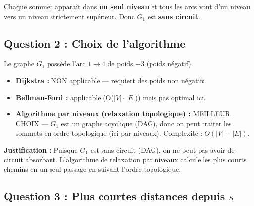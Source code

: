 \documentclass[12pt,a4paper]{article}
\begin{document}
\begin{solution}
\begin{center}
\end{center}

Chaque sommet apparaît dans \textbf{un seul niveau} et tous les arcs vont d'un niveau vers un niveau strictement supérieur. Donc $G_1$ est \textcolor{importantrouge}{\textbf{sans circuit}}.
\end{solution}

\subsection{Question 2 : Choix de l'algorithme}

\begin{solution}
Le graphe $G_1$ possède l'arc $1 \to 4$ de poids $-3$ (poids négatif).

\begin{itemize}
    \item \textcolor{importantrouge}{\textbf{Dijkstra :}} NON applicable --- requiert des poids non négatifs.
    \item \textbf{Bellman-Ford :} applicable (O($|V| \cdot |E|$)) mais pas optimal ici.
    \item \textcolor{defvert}{\textbf{Algorithme par niveaux (relaxation topologique) :}} MEILLEUR CHOIX --- $G_1$ est un graphe acyclique (DAG), donc on peut traiter les sommets en ordre topologique (ici par niveaux). Complexité : $O(|V| + |E|)$.
\end{itemize}

\textbf{Justification :} Puisque $G_1$ est sans circuit (DAG), on ne peut pas avoir de circuit absorbant. L'algorithme de relaxation par niveaux calcule les plus courts chemins en un seul passage en suivant l'ordre topologique.
\end{solution}

\subsection{Question 3 : Plus courtes distances depuis $s$}
\end{document}
